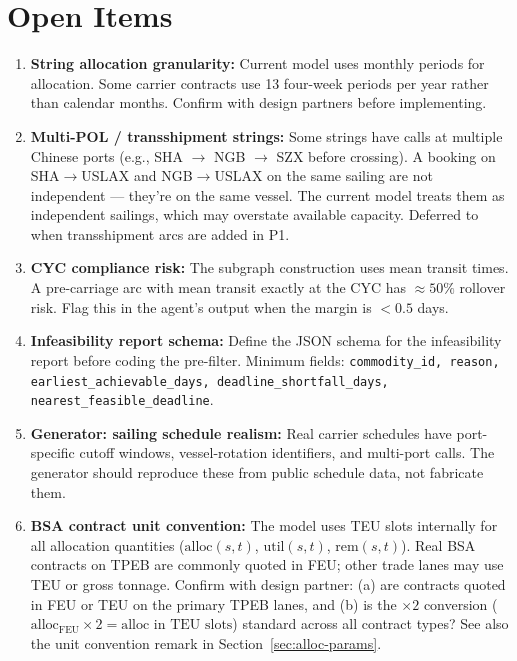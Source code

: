 \documentclass[11pt,a4paper]{article}
\theoremstyle{definition}
\begin{document}
\section{Open Items}

\begin{enumerate}
  \item \textbf{String allocation granularity:} Current model uses monthly periods for
        allocation. Some carrier contracts use 13 four-week periods per year rather than
        calendar months. Confirm with design partners before implementing.

  \item \textbf{Multi-POL / transshipment strings:} Some strings have calls at multiple
        Chinese ports (e.g., SHA $\to$ NGB $\to$ SZX before crossing). A booking on SHA$\to$USLAX
        and NGB$\to$USLAX on the same sailing are not independent — they're on the same vessel.
        The current model treats them as independent sailings, which may overstate available
        capacity. Deferred to when transshipment arcs are added in P1.

  \item \textbf{CYC compliance risk:} The subgraph construction uses mean transit times.
        A pre-carriage arc with mean transit exactly at the CYC has $\approx 50\%$ rollover risk.
        Flag this in the agent's output when the margin is $< 0.5$ days.

  \item \textbf{Infeasibility report schema:} Define the JSON schema for the infeasibility
        report before coding the pre-filter. Minimum fields: \texttt{commodity\_id, reason,
        earliest\_achievable\_days, deadline\_shortfall\_days, nearest\_feasible\_deadline}.

  \item \textbf{Generator: sailing schedule realism:} Real carrier schedules have port-specific
        cutoff windows, vessel-rotation identifiers, and multi-port calls. The generator
        should reproduce these from public schedule data, not fabricate them.

  \item \textbf{BSA contract unit convention:} The model uses TEU slots internally for all
        allocation quantities ($\text{alloc}(s,t)$, $\text{util}(s,t)$, $\text{rem}(s,t)$).
        Real BSA contracts on TPEB are commonly quoted in FEU; other trade lanes may use TEU
        or gross tonnage. Confirm with design partner: (a) are contracts quoted in FEU or TEU
        on the primary TPEB lanes, and (b) is the $\times 2$ conversion
        ($\text{alloc}_{\text{FEU}} \times 2 = \text{alloc in TEU slots}$) standard across
        all contract types? See also the unit convention remark in
        Section~\ref{sec:alloc-params}.


\end{enumerate}
\end{document}

